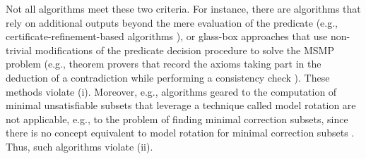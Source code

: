 \documentclass[]{elsarticle}
\begin{document}
	Not all algorithms meet these two criteria. For instance, there are algorithms that rely on additional outputs beyond the mere evaluation of the predicate (e.g., certificate-refinement-based algorithms \cite{marques2013minimal}), 
	or glass-box approaches that use non-trivial modifications of the predicate decision procedure to solve the MSMP problem (e.g., theorem provers that record the axioms taking part in the deduction of a contradiction while performing a consistency check \cite{Kalyanpur2006a}). These methods violate (i). 
	Moreover, e.g., algorithms geared to the computation of minimal unsatisfiable subsets that leverage a technique called model rotation \cite{marques2011improving} are not applicable, e.g., to the problem of finding minimal correction subsets, since there is no concept equivalent to model rotation for minimal correction subsets \cite{marques2013minimal}.
	Thus, such algorithms violate (ii). 
	
\end{document}
